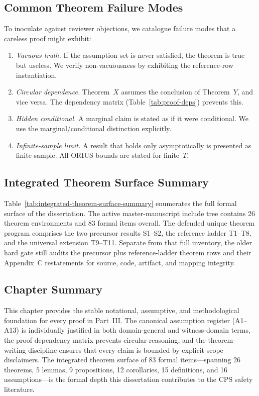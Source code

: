 \subsection{Common Theorem Failure Modes}

To inoculate against reviewer objections, we catalogue failure modes
that a careless proof might exhibit:

\begin{enumerate}
  \item \emph{Vacuous truth.}  If the assumption set is never satisfied,
    the theorem is true but useless.  We verify non-vacuousness by
    exhibiting the reference-row instantiation.
  \item \emph{Circular dependence.}  Theorem~$X$ assumes the conclusion
    of Theorem~$Y$, and vice versa.  The dependency matrix
    (Table~\ref{tab:proof-deps}) prevents this.
  \item \emph{Hidden conditional.}  A marginal claim is stated as if it
    were conditional.  We use the marginal/conditional distinction
    explicitly.
  \item \emph{Infinite-sample limit.}  A result that holds only
    asymptotically is presented as finite-sample.  All ORIUS bounds
    are stated for finite~$T$.
\end{enumerate}

\subsection{Integrated Theorem Surface Summary}

Table~\ref{tab:integrated-theorem-surface-summary} enumerates the full
formal surface of the dissertation.  The active master-manuscript include
tree contains 26 theorem environments and 83 formal items overall.  The
defended unique theorem program comprises the two precursor results S1--S2,
the reference ladder T1--T8, and the universal extension T9--T11.  Separate
from that full inventory, the older hard gate still audits the precursor plus
reference-ladder theorem rows and their Appendix~C restatements for source,
code, artifact, and mapping integrity.



\subsection{Chapter Summary}

This chapter provides the stable notational, assumptive, and
methodological foundation for every proof in Part~III.  The canonical
assumption register (A1--A13) is individually justified in both domain-general
and witness-domain terms, the proof dependency matrix prevents
circular reasoning, and the theorem-writing discipline ensures that
every claim is bounded by explicit scope disclaimers.  The integrated
theorem surface of 83 formal items---spanning 26 theorems, 5 lemmas,
9 propositions, 12 corollaries, 15 definitions, and 16 assumptions---is
the formal depth this dissertation contributes to the CPS safety
literature.


